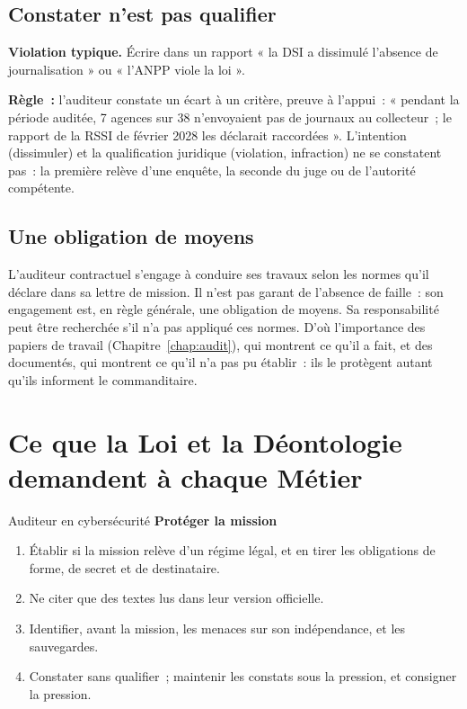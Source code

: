 \subsection{Constater n'est pas qualifier}

\begin{boxalert}
\textbf{Violation typique.} Écrire dans un rapport « la DSI a dissimulé
l'absence de journalisation » ou « l'ANPP viole la loi ».

\smallskip
\textbf{Règle~:} l'auditeur constate un écart à un critère, preuve à
l'appui~: « pendant la période auditée, 7 agences sur 38 n'envoyaient pas
de journaux au collecteur~; le rapport de la RSSI de février 2028 les
déclarait raccordées ». L'intention (dissimuler) et la qualification
juridique (violation, infraction) ne se constatent pas~: la première
relève d'une enquête, la seconde du juge ou de l'autorité compétente.
\end{boxalert}

\subsection{Une obligation de moyens}

L'auditeur contractuel s'engage à conduire ses travaux selon les normes
qu'il déclare dans sa lettre de mission. Il n'est pas garant de l'absence
de faille~: son engagement est, en règle générale, une obligation de
moyens. Sa responsabilité peut être recherchée s'il n'a pas appliqué ces
normes. D'où l'importance des papiers de travail (Chapitre~\ref{chap:audit}),
qui montrent ce qu'il a fait, et des \NEK{} documentés, qui montrent ce
qu'il n'a pas pu établir~: ils le protègent autant qu'ils informent le
commanditaire.

\section{Ce que la Loi et la Déontologie demandent à chaque Métier}
\label{sec:c10-metiers}

\begin{boxmetier}{Auditeur en cybersécurité}
\textbf{Protéger la mission}
\begin{enumerate}
    \item Établir si la mission relève d'un régime légal, et en tirer les
          obligations de forme, de secret et de destinataire.
    \item Ne citer que des textes lus dans leur version officielle.
    \item Identifier, avant la mission, les menaces sur son indépendance,
          et les sauvegardes.
    \item Constater sans qualifier~; maintenir les constats sous la
          pression, et consigner la pression.
\end{enumerate}
\end{boxmetier}

